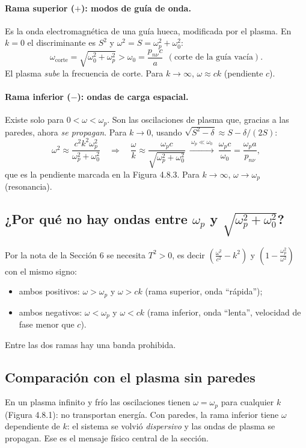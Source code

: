 \documentclass[11pt,a4paper]{article}
\renewcommand{\wp}{\omega_p}
\begin{document}
\paragraph{Rama superior ($+$): modos de guía de onda.} Es la onda electromagnética de una guía hueca, modificada por el plasma. En $k=0$ el discriminante es $S^2$ y $\omega^2=S=\wp^2+\omega_0^2$:
\[
\omega_{\text{corte}}=\sqrt{\omega_0^2+\wp^2}>\omega_0=\frac{p_{n\nu}c}{a}\ \ (\text{corte de la guía vacía}).
\]
El plasma \emph{sube} la frecuencia de corte. Para $k\to\infty$, $\omega\approx ck$ (pendiente $c$).

\paragraph{Rama inferior ($-$): ondas de carga espacial.} Existe solo para $0<\omega<\wp$. Son las oscilaciones de plasma que, gracias a las paredes, ahora \emph{se propagan}. Para $k\to0$, usando $\sqrt{S^2-\delta}\approx S-\delta/(2S)$:
\[
\omega^2\approx\frac{c^2k^2\wp^2}{\wp^2+\omega_0^2}\quad\Longrightarrow\quad
\frac{\omega}{k}\approx\frac{\wp c}{\sqrt{\wp^2+\omega_0^2}}\ \xrightarrow{\ \wp\ll\omega_0\ }\ \frac{\wp c}{\omega_0}=\frac{\wp a}{p_{n\nu}},
\]
que es la pendiente marcada en la Figura 4.8.3. Para $k\to\infty$, $\omega\to\wp$ (resonancia).

\subsection{¿Por qué no hay ondas entre $\wp$ y $\sqrt{\wp^2+\omega_0^2}$?}
Por la nota de la Sección 6 se necesita $T^2>0$, es decir $\left(\frac{\omega^2}{c^2}-k^2\right)$ y $\left(1-\frac{\wp^2}{\omega^2}\right)$ con el mismo signo:
\begin{itemize}
\item ambos positivos: $\omega>\wp$ y $\omega>ck$ (rama superior, onda ``rápida'');
\item ambos negativos: $\omega<\wp$ y $\omega<ck$ (rama inferior, onda ``lenta'', velocidad de fase menor que $c$).
\end{itemize}
Entre las dos ramas hay una banda prohibida.

\subsection{Comparación con el plasma sin paredes}
En un plasma infinito y frío las oscilaciones tienen $\omega=\wp$ para cualquier $k$ (Figura 4.8.1): no transportan energía. Con paredes, la rama inferior tiene $\omega$ dependiente de $k$: el sistema se volvió \emph{dispersivo} y las ondas de plasma se propagan. Ese es el mensaje físico central de la sección.
\end{document}
